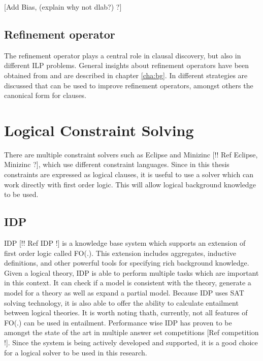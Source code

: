 [Add Bias, (explain why not dlab?) ?]

\subsection{Refinement operator}
The refinement operator plays a central role in clausal discovery, but also in different ILP problems.
General insights about refinement operators have been obtained from \cite{DeRaedt:LRLearning} and are described in chapter \ref{cha:bg}.
In \cite{DeRaedt:CondensedRepresentations} different strategies are discussed that can be used to improve refinement operators, amongst others the canonical form for clauses.

\section{Logical Constraint Solving}
\label{sec:logical_constraint_solving}
There are multiple constraint solvers such as Eclipse and Minizinc [!! Ref Eclipse, Minizinc ?], which use different constraint languages.
Since in this thesis constraints are expressed as logical clauses, it is useful to use a solver which can work directly with first order logic.
This will allow logical background knowledge to be used.

\subsection{IDP}
IDP [!! Ref IDP !] is a knowledge base system which supports an extension of first order logic called FO(.).
This extension includes aggregates, inductive definitions, and other powerful tools for specifying rich background knowledge.
Given a logical theory, IDP is able to perform multiple tasks which are important in this context.
It can check if a model is consistent with the theory, generate a model for a theory as well as expand a partial model.
Because IDP uses SAT solving technology, it is also able to offer the ability to calculate entailment between logical theories.
It is worth noting thath, currently, not all features of FO(.) can be used in entailment.
Performance wise IDP has proven to be amongst the state of the art in multiple answer set competitions [Ref competition !].
Since the system is being actively developed and supported, it is a good choice for a logical solver to be used in this research.

